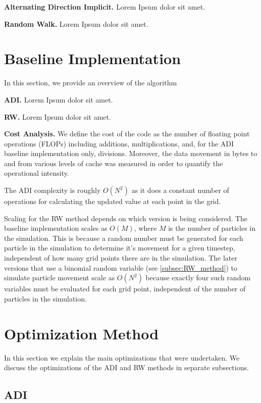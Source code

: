 \documentclass[letterpaper]{article}
\newcommand{\mypar}[1]{{\bf #1.}}
\begin{document}
\mypar{Alternating Direction Implicit}
Lorem Ipsum dolor sit amet.

\mypar{Random Walk}
Lorem Ipsum dolor sit amet.

\section{Baseline Implementation}\label{sec:baseline}

In this section, we provide an overview of the algorithm 

\mypar{ADI}
Lorem Ipsum dolor sit amet.

\mypar{RW}
Lorem Ipsum dolor sit amet.

\mypar{Cost Analysis}
We define the cost of the code as the number of floating point operations (FLOPs) including additions, multiplications, and, for the ADI baseline implementation only, divisions. Moreover, the data movement in bytes to and from various levels of cache was measured in order to quantify the operational intensity.

The ADI complexity is roughly $O(N^2)$ as it does a constant number of operations for calculating the updated value at each point in the grid.

Scaling for the RW method depends on which version is being considered. The baseline implementation scales as $O(M)$, where $M$ is the number of particles in the simulation. This is because a random number must be generated for each particle in the simulation to determine it's movement for a given timestep, independent of how many grid points there are in the simulation. The later versions that use a binomial random variable (see \ref{subsec:RW_method}) to simulate particle movement scale as $O(N^2)$ because exactly four such random variables must be evaluated for each grid point, independent of the number of particles in the simulation.


\section{Optimization Method}\label{sec:method}

In this section we explain the main optimizations that were undertaken.
We discuss the optimizations of the ADI and RW methods in separate subsections.

\subsection{ADI}\label{subsec:ADI_method}
\end{document}
